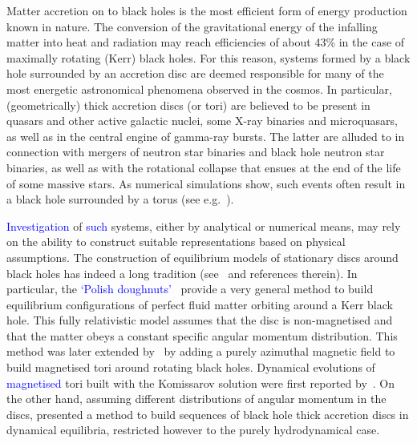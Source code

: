 \documentclass{aa}
\newcommand{\sg}[1]{\textcolor{blue}{#1}}
\begin{document}
Matter accretion on to black holes is the most efficient form of energy production known in nature. The conversion of the
gravitational energy of the infalling matter into heat and radiation may reach efficiencies of about 43\% in the case of maximally rotating (Kerr) black holes. For this reason, systems formed by a black hole surrounded by an accretion disc are deemed responsible for many of the most energetic astronomical phenomena observed in the cosmos. In particular, (geometrically) thick accretion discs (or tori) are believed to be present in quasars and other active galactic nuclei, some X-ray binaries and microquasars, as well as in the central engine of gamma-ray bursts.
The latter are alluded to in connection with mergers of neutron star binaries and black hole neutron star binaries, as well as with the rotational collapse that ensues at the end of the life of some massive stars. As numerical simulations show, such events  often result in a black hole surrounded by a torus (see e.g.~\cite{Rezzolla:2010,Sekiguchi:2011,Faber:2012,Shibata:2011,Baiotti:2017}).

\sg{Investigation} of \sg{such} systems, either by analytical or numerical means, may rely on the ability to construct suitable 
representations based on physical assumptions. The construction of equilibrium models of stationary discs around black holes has indeed a long tradition (see~\cite{Abramowicz:2013} and references therein). In particular, the \sg{`Polish doughnuts'}~\citep{Abramowicz:1978,Kozlowski:1978} provide a  very general method to build equilibrium configurations of perfect fluid matter orbiting around a Kerr black hole. This fully relativistic model assumes that the disc is non-magnetised and that the matter obeys a  constant specific angular momentum distribution. This method was later extended by~\cite{Komissarov:2006}  by adding a purely azimuthal magnetic field to build magnetised tori around rotating black holes. Dynamical evolutions of \sg{magnetised} tori built with the Komissarov solution were first reported by~\cite{Montero:2007}.
On the other hand, assuming different distributions of angular momentum in the discs, \citet{Qian:2009} presented a method to build sequences of black hole thick accretion discs in dynamical equilibria, restricted however to the purely hydrodynamical case. 
 
\end{document}
